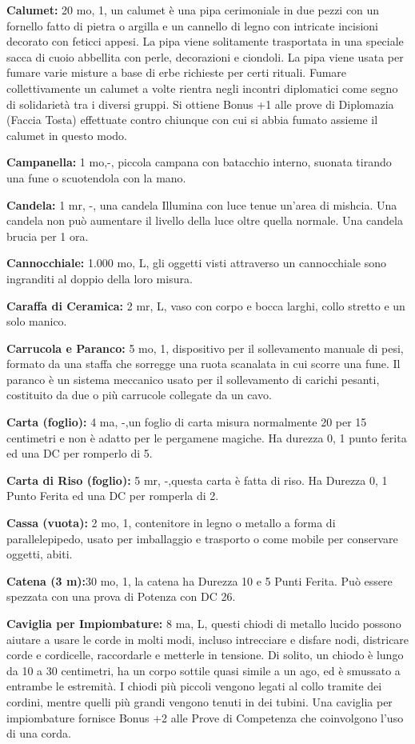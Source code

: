 \documentclass[a4paper,11pt,twoside,openany]{book}
\begin{document}
\textbf{Calumet:} 20 mo, 1, un calumet è una pipa cerimoniale in due pezzi con un fornello fatto di pietra o argilla e un cannello di legno con intricate incisioni decorato con feticci appesi. La pipa viene solitamente trasportata in una speciale sacca di cuoio abbellita con perle, decorazioni e ciondoli. La pipa viene usata per fumare varie misture a base di erbe richieste per certi rituali. Fumare collettivamente un calumet a volte rientra negli incontri diplomatici come segno di solidarietà tra i diversi gruppi. Si ottiene Bonus +1 alle prove di Diplomazia (Faccia Tosta) effettuate contro chiunque con cui si abbia fumato assieme il calumet in questo modo.

\textbf{Campanella:} 1 mo,-, piccola campana con batacchio interno, suonata tirando una fune o scuotendola con la mano.

\textbf{Candela:} 1 mr, -, una candela Illumina con luce tenue un'area di mishcia. Una candela non può aumentare il livello della luce oltre quella normale. Una candela brucia per 1 ora.

\textbf{Cannocchiale:} 1.000 mo, L, gli oggetti visti attraverso un cannocchiale sono ingranditi al doppio della loro misura.

\textbf{Caraffa di Ceramica:} 2 mr, L, vaso con corpo e bocca larghi, collo stretto e un solo manico.

\textbf{Carrucola e Paranco:} 5 mo, 1, dispositivo per il sollevamento manuale di pesi, formato da una staffa che sorregge una ruota scanalata in cui scorre una fune. Il paranco è un sistema meccanico usato per il sollevamento di carichi pesanti, costituito da due o più carrucole collegate da un cavo.

\textbf{Carta (foglio):} 4 ma, -,un foglio di carta misura normalmente 20 per 15 centimetri e non è adatto per le pergamene magiche. Ha durezza 0, 1 punto ferita ed una DC per romperlo di 5.

\textbf{Carta di Riso (foglio):} 5 mr, -,questa carta è fatta di riso. Ha Durezza 0, 1 Punto Ferita ed una DC per romperla di 2.

\textbf{Cassa (vuota):} 2 mo, 1, contenitore in legno o metallo a forma di parallelepipedo, usato per imballaggio e trasporto o come mobile per conservare oggetti, abiti.

\textbf{Catena (3 m):}30 mo, 1, la catena ha Durezza 10 e 5 Punti Ferita. Può essere spezzata con una prova di Potenza con DC 26.

\textbf{Caviglia per Impiombature:} 8 ma, L, questi chiodi di metallo lucido possono aiutare a usare le corde in molti modi, incluso intrecciare e disfare nodi, districare corde e cordicelle, raccordarle e metterle in tensione. Di solito, un chiodo è lungo da 10 a 30 centimetri, ha un corpo sottile quasi simile a un ago, ed è smussato a entrambe le estremità. I chiodi più piccoli vengono legati al collo tramite dei cordini, mentre quelli più grandi vengono tenuti in dei tubini. Una caviglia per impiombature fornisce Bonus +2 alle Prove di Competenza che coinvolgono l'uso di una corda.
\end{document}

